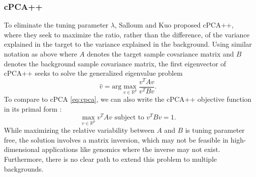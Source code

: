 \documentclass[12pt]{article}
\begin{document}
\subsubsection{cPCA++}
To eliminate the tuning parameter $\lambda$, Salloum and Kuo  \cite{Salloum} proposed cPCA++, where they seek to maximize the ratio, rather than the difference, of the variance explained in the target to the variance explained in the background.
Using similar notation as above where $A$ denotes the target sample covariance matrix and $B$ denotes the background sample covariance matrix, the first eigenvector of cPCA++ seeks to solve the generalized eigenvalue problem
\[\hat{v} = \text{arg}\max_{v\in \mathbb{R}^p} \frac{v^T A v}{v^T B v}.\]
To compare to cPCA \eqref{eq:cpca}, we can also write the cPCA++ objective function in its primal form \cite{ghojogh2019eigenvalue}:
\begin{equation}
  \label{eq:cpca++}
  \max_{v \in \mathbb{R}^p}{v^T A v}  \mbox{ subject to } v^T B v = 1.
\end{equation}
While maximizing the relative variability between $A$ and $B$ is tuning parameter free, the solution involves a matrix inversion, which may not be feasible in high-dimensional applications like genomics where the inverse may not exist.  Furthermore, there is no clear path to extend this problem to multiple backgrounds.

\end{document}
